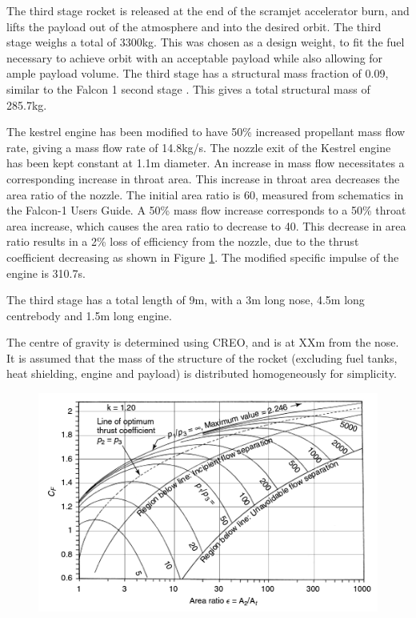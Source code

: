 	The third stage rocket is released at the end of the scramjet accelerator burn, and lifts the payload out of the atmosphere and into the desired orbit. The third stage weighs a total of 3300kg. This was chosen as a design weight, to fit the fuel necessary to achieve orbit with an acceptable payload while also allowing for ample payload volume. The third stage has a structural mass fraction of 0.09, similar to the Falcon 1 second stage \cite{Vehicle2008}. This gives a total structural mass of 285.7kg. 
	
	

	
The kestrel engine has been modified to have 50\% increased propellant mass flow rate, giving a mass flow rate of 14.8kg/s. The nozzle exit of the Kestrel engine has been kept constant at 1.1m diameter. An increase in mass flow necessitates a corresponding increase in throat area. This increase in throat area decreases the area ratio of the nozzle. The initial area ratio is 60, measured from schematics in the Falcon-1 Users Guide. A 50\% mass flow increase corresponds to a 50\% throat area increase, which causes the area ratio to decrease to 40. This decrease in area ratio results in a 2\% loss of efficiency from the nozzle\cite{RPE}, due to the thrust coefficient decreasing as shown in Figure \ref{fig:ThrustCoefficient-Arat}. The modified specific impulse of the engine is 310.7s.



The third stage has a total length of 9m, with a 3m long nose, 4.5m long centrebody and 1.5m long engine.
	
	The centre of gravity is determined using CREO, and is at XXm from the nose. It is assumed that the mass of the structure of the rocket (excluding fuel tanks, heat shielding, engine and payload) is distributed homogeneously for simplicity.
	
	
	\begin{figure}
\centering
\includegraphics[width=0.7\linewidth]{"figures/3_vehicle_design/Thrust Coefficient - Arat"}
\caption{\cite{RPE}}
\label{fig:ThrustCoefficient-Arat}
\end{figure}



